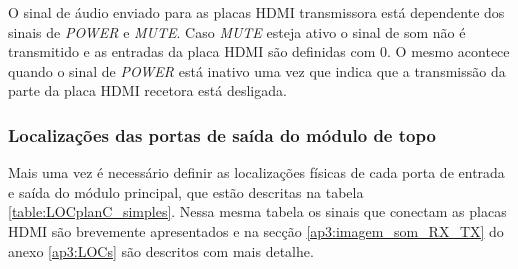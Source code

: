 O sinal de áudio enviado para as placas HDMI transmissora está dependente dos sinais de \textit{POWER} e \textit{MUTE}. Caso \textit{MUTE} esteja ativo o sinal de som não é transmitido e as entradas da placa HDMI são definidas com 0. O mesmo acontece quando o sinal de \textit{POWER} está inativo uma vez que indica que a transmissão da parte da placa HDMI recetora está desligada.

\subsubsection*{Localizações das portas de saída do módulo de topo} 

Mais uma vez é necessário definir as localizações físicas de cada porta de entrada e saída do módulo principal, que estão descritas na tabela \ref{table:LOCplanC_simples}. Nessa mesma tabela os sinais que conectam as placas HDMI são brevemente apresentados e na secção \ref{ap3:imagem_som_RX_TX} do anexo \ref{ap3:LOCs} são descritos com mais detalhe.


